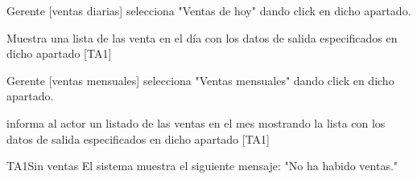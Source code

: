 \begin{UCtrayectoria}{Gerente  [ventas diarias]}
        \UCpaso[\UCactor] selecciona "Ventas de hoy" dando click en dicho apartado.
        
        \UCpaso Muestra una lista de las venta  en el día con los datos de salida especificados en dicho apartado [TA1]

\end{UCtrayectoria}


\begin{UCtrayectoria}{Gerente  [ventas mensuales]}
        \UCpaso[\UCactor] selecciona "Ventas mensuales" dando click en dicho apartado.
        
        \UCpaso informa al actor un listado  de las ventas en el mes mostrando la lista con los datos de salida especificados en dicho apartado [TA1]

\end{UCtrayectoria}

\begin{UCtrayectoriaA}{TA1}{Sin ventas}
    \UCpaso El sistema muestra el siguiente mensaje: "No ha habido ventas."
    \end{UCtrayectoriaA}
    
